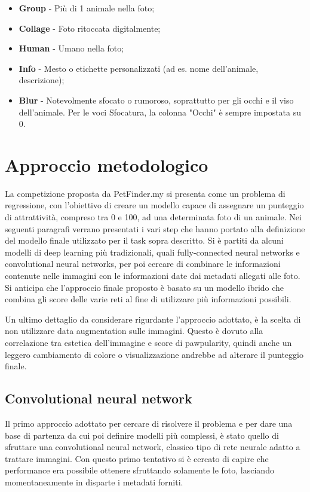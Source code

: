 \begin{itemize}
        \item \textbf{Group} - Più di 1 animale nella foto;
        \item \textbf{Collage} - Foto ritoccata digitalmente;
        \item \textbf{Human} - Umano nella foto;
        \item \textbf{Info} - Mesto o etichette personalizzati (ad es. nome dell'animale, descrizione);
        \item \textbf{Blur} - Notevolmente sfocato o rumoroso, soprattutto per gli occhi e il viso dell'animale. Per le voci Sfocatura, la colonna "Occhi" è sempre impostata su 0.
    \end{itemize}
    

\section{Approccio metodologico}

    La competizione proposta da PetFinder.my si presenta come un problema di regressione, con l'obiettivo di creare un modello capace di assegnare un punteggio di attrattività, 
    compreso tra 0 e 100, ad una determinata foto di un animale.
    Nei seguenti paragrafi verrano presentati i vari step che hanno portato alla definizione del modello finale utilizzato per il task sopra descritto.
    Si è partiti da alcuni modelli di deep learning più tradizionali, quali fully-connected neural networks e convolutional neural networks, per poi cercare di combinare le informazioni
    contenute nelle immagini con le informazioni date dai metadati allegati alle foto.
    Si anticipa che l'approccio finale proposto è basato su un modello ibrido che combina gli score delle varie reti al fine di utilizzare più informazioni possibili.
    
    Un ultimo dettaglio da considerare rigurdante l'approccio adottato, è la scelta di non utilizzare data augmentation sulle immagini. Questo è dovuto alla correlazione tra estetica dell'immagine e score di pawpularity, quindi anche un leggero cambiamento di colore o visualizzazione andrebbe ad alterare il punteggio finale. 

    \subsection{Convolutional neural network}
    \label{cnn}
        Il primo approccio adottato per cercare di risolvere il problema e per dare una base di partenza da cui poi definire modelli più complessi, è stato quello di sfruttare
        una convolutional neural network, classico tipo di rete neurale adatto a trattare immagini. Con questo primo tentativo si è cercato di capire che performance era possibile
        ottenere sfruttando solamente le foto, lasciando momentaneamente in disparte i metadati forniti.


